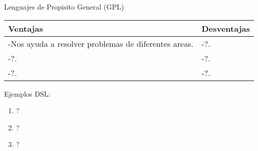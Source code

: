 \documentclass{article}
\begin{document}
\begin{center}
Lenguajes de Propisito General (GPL)
\end{center}
\begin{tabularx}{\textwidth}{X|X}
	  \textbf{Ventajas} & \textbf{Desventajas} \\
	\hline
	-Nos ayuda a resolver problemas de diferentes areas. & -?.\\
	-?. & -?.\\
	-?. & -?.\\
\end{tabularx}
\begin{center}
Ejemplos DSL:
\end{center}
\begin{enumerate}
  \item ?
  \item ?
  \item ? 
\end{enumerate}
\end{document}
